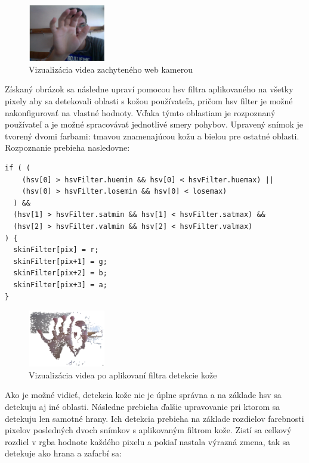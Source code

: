 \begin{figure}[H]
  \centering
  \includegraphics[width=0.3\textwidth]{img/motion/video.png}
  \caption[Vizualizácia videa zachyteného web kamerou]{
    Vizualizácia videa zachyteného web kamerou}
  \label{fig: motion-video}
\end{figure}

Získaný obrázok sa následne upraví pomocou hsv filtra aplikovaného na všetky pixely aby sa detekovali oblasti s kožou používateľa, pričom hsv filter je možné nakonfigurovať na vlastné hodnoty. Vďaka týmto oblastiam je rozpoznaný používateľ a je možné spracovávať jednotlivé smery pohybov. Upravený snímok je tvorený dvomi farbami: tmavou znamenajúcou kožu a bielou pre ostatné oblasti. Rozpoznanie prebieha nasledovne:

\begin{lstlisting}
if ( (
    (hsv[0] > hsvFilter.huemin && hsv[0] < hsvFilter.huemax) || 
    (hsv[0] > hsvFilter.losemin && hsv[0] < losemax)
  ) && 
  (hsv[1] > hsvFilter.satmin && hsv[1] < hsvFilter.satmax) &&
  (hsv[2] > hsvFilter.valmin && hsv[2] < hsvFilter.valmax)
) {
  skinFilter[pix] = r;
  skinFilter[pix+1] = g;
  skinFilter[pix+2] = b;
  skinFilter[pix+3] = a;
}
\end{lstlisting}

\begin{figure}[H]
  \centering
  \includegraphics[width=0.3\textwidth]{img/motion/skin.png}
  \caption[Vizualizácia videa po aplikovaní filtra detekcie kože]{
    Vizualizácia videa po aplikovaní filtra detekcie kože}
  \label{fig: motion-skin}
\end{figure}

Ako je možné vidieť, detekcia kože nie je úplne správna a na základe hsv sa detekuju aj iné oblasti. Následne prebieha ďalšie upravovanie pri ktorom sa detekuju len samotné hrany. Ich detekcia prebieha na základe rozdielov farebnosti pixelov posledných dvoch snímkov \cite{MotionIllumination} s aplikovaným filtrom kože. Zistí sa celkový rozdiel v rgba hodnote každého pixelu a pokiaľ nastala výrazná zmena, tak sa detekuje ako hrana a zafarbí sa:

